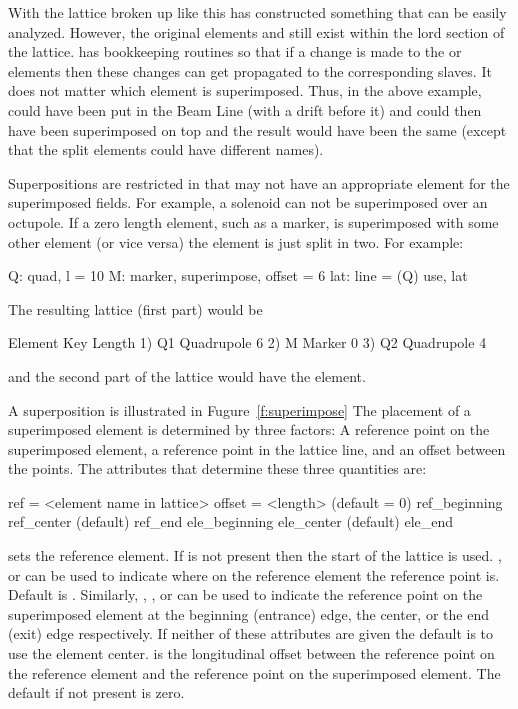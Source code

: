 With the lattice broken up like this \bmad has constructed something
that can be easily analyzed. However, the original elements  and
 still exist within the lord section of the lattice. \bmad has
bookkeeping routines so that if a change is made to the  or
 elements then these changes can get propagated to the
corresponding slaves.  It does not matter which element is
superimposed. Thus, in the above example,  could have been put
in the Beam Line (with a drift before it) and  could then have
been superimposed on top and the result would have been the same
(except that the split elements could have different names).

Superpositions are restricted in that \bmad may not have an
appropriate element for the superimposed fields. For example, a
solenoid can not be superimposed over an octupole.  If a zero length
element, such as a marker, is superimposed with some other element (or
vice versa) the element is just split in two. For example:
\begin{example}
  Q: quad, l = 10
  M: marker, superimpose, offset = 6
  lat: line = (Q)
  use, lat
\end{example}
The resulting lattice (first part) would be
\begin{example}
        Element   Key           Length
  1)    Q{\B}1       Quadrupole    6
  2)    M         Marker        0
  3)    Q{\B}2       Quadrupole    4
\end{example}
and the second part of the lattice would have the  element.
 
A superposition is illustrated in Fugure~\ref{f:superimpose} The
placement of a superimposed element is determined by three factors: A
reference point on the superimposed element, a reference point in the
lattice line, and an offset between the points. The attributes that
determine these three quantities are: 
\begin{example}
  ref = <element name in lattice>
  offset = <length>      (default = 0)
  ref_beginning
  ref_center             (default)
  ref_end
  ele_beginning
  ele_center             (default)
  ele_end
\end{example}
 sets the reference element. If  is not present then
the start of the lattice is used. , 
or  can be used to indicate where on the reference element
the reference point is. Default is . Similarly,
, , or  can be used to
indicate the reference point on the superimposed element at the
beginning (entrance) edge, the center, or the end (exit) edge
respectively. If neither of these attributes are given the default is
to use the element center.  is the longitudinal offset
between the reference point on the reference element and the reference
point on the superimposed element. The default if not present is zero.

